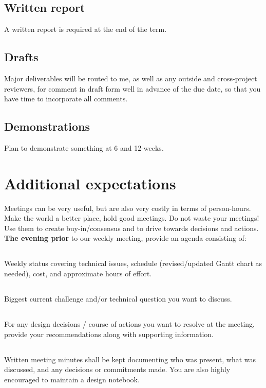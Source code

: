 \documentclass[10pt,courier]{navymemo}
\begin{document}
\subsection{Written report} A written report is required at the end of the term. 
\subsection{Drafts} Major deliverables will be routed to me, as well as any outside and cross-project reviewers, for comment in draft form well in advance of the due date, so that you have time to incorporate all comments. 
\subsection{Demonstrations} Plan to demonstrate something at 6 and 12-weeks. 

\section{Additional expectations}  Meetings can be very useful, but are also very costly in terms of person-hours.  Make the world a better place, hold good meetings.  Do not waste your meetings! Use them to create buy-in/consensus and to drive towards decisions and actions.  \textbf{The evening prior} to our weekly meeting, provide an agenda consisting of:
\subsection{} Weekly status covering technical issues, schedule (revised/updated Gantt chart as needed), cost, and approximate hours of effort. 
\subsection{} Biggest current challenge and/or technical question you want to discuss.
\subsection{} For any design decisions / course of actions you want to resolve at the meeting, provide your recommendations along with supporting information.
\subsection{} Written meeting minutes shall be kept documenting who was present, what was discussed, and any decisions or commitments made.  You are also highly encouraged to maintain a design notebook. 
\end{document}
